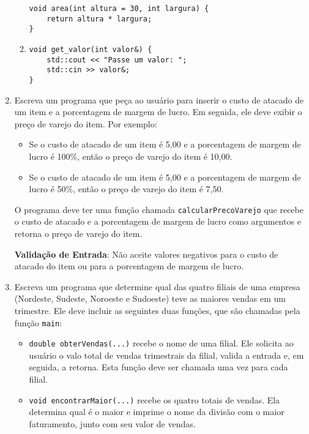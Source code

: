 \documentclass[12pt]{article}
\begin{document}
\begin{enumerate}
\begin{enumerate}
\begin{verbatim}
void area(int altura = 30, int largura) {
    return altura * largura;
}
        \end{verbatim}
              \item \begin{verbatim}
void get_valor(int valor&) {
    std::cout << "Passe um valor: ";
    std::cin >> valor&;
}
        \end{verbatim}
          \end{enumerate}
    \item Escreva um programa que peça ao usuário para inserir o custo de atacado de um item e a porcentagem de margem de lucro. Em seguida, ele deve exibir o preço de varejo do item. Por exemplo:
          \begin{itemize}
              \item Se o custo de atacado de um item é 5,00 e a porcentagem de margem de lucro é 100\%, então o preço de varejo do item é 10,00.
              \item Se o custo de atacado de um item é 5,00 e a porcentagem de margem de lucro é 50\%, então o preço de varejo do item é 7,50.
          \end{itemize}

          O programa deve ter uma função chamada \texttt{calcularPrecoVarejo} que recebe o custo de atacado e a porcentagem de margem de lucro como argumentos e retorna o preço de varejo do item.

          \textbf{Validação de Entrada}: Não aceite valores negativos para o custo de atacado do item ou para a porcentagem de margem de lucro.


    \item Escreva um programa que determine qual das quatro filiais de uma empresa (Nordeste, Sudeste, Noroeste e Sudoeste) teve as maiores vendas em um trimestre. Ele deve incluir as seguintes duas funções, que são chamadas pela função \texttt{main}:
          \begin{itemize}
              \item  \texttt{double obterVendas(...)} recebe o nome de uma filial. Ele solicita ao usuário o valo total de vendas trimestrais da filial, valida a entrada e, em seguida, a retorna. Esta função deve ser chamada uma vez para cada filial.
              \item \texttt{void encontrarMaior(...)} recebe os quatro totais de vendas. Ela determina qual é o maior e imprime o nome da divisão com o maior faturamento, junto com seu valor de vendas.
          \end{itemize}


\end{enumerate}
\end{document}
